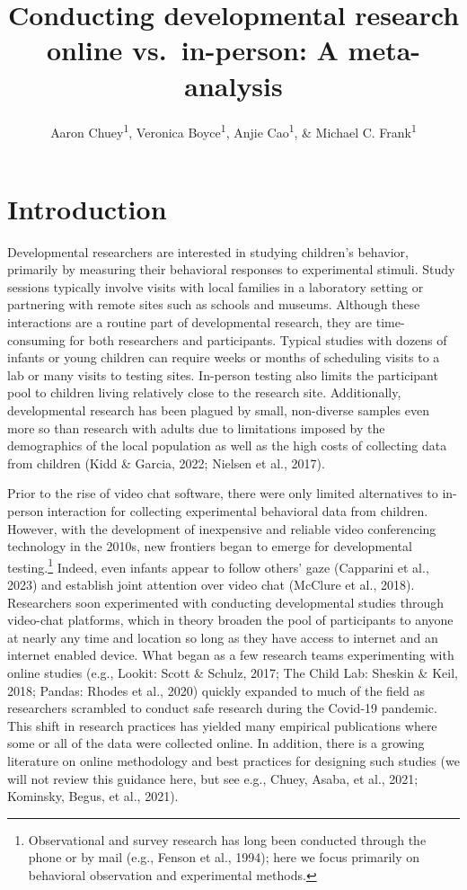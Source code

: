\documentclass[
  man,floatsintext]{apa6}
\title{Conducting developmental research online vs.~in-person: A meta-analysis}
\author{Aaron Chuey\textsuperscript{1}, Veronica Boyce\textsuperscript{1}, Anjie Cao\textsuperscript{1}, \& Michael C. Frank\textsuperscript{1}}
\date{}
\affiliation{\vspace{0.5cm}\textsuperscript{1} Stanford University, Department of Psychology}
\begin{document}
\maketitle

\hypertarget{introduction}{%
\section{Introduction}\label{introduction}}

Developmental researchers are interested in studying children's behavior, primarily by measuring their behavioral responses to experimental stimuli. Study sessions typically involve visits with local families in a laboratory setting or partnering with remote sites such as schools and museums. Although these interactions are a routine part of developmental research, they are time-consuming for both researchers and participants. Typical studies with dozens of infants or young children can require weeks or months of scheduling visits to a lab or many visits to testing sites. In-person testing also limits the participant pool to children living relatively close to the research site. Additionally, developmental research has been plagued by small, non-diverse samples even more so than research with adults due to limitations imposed by the demographics of the local population as well as the high costs of collecting data from children (Kidd \& Garcia, 2022; Nielsen et al., 2017).

Prior to the rise of video chat software, there were only limited alternatives to in-person interaction for collecting experimental behavioral data from children. However, with the development of inexpensive and reliable video conferencing technology in the 2010s, new frontiers began to emerge for developmental testing.\footnote{Observational and survey research has long been conducted through the phone or by mail (e.g., Fenson et al., 1994); here we focus primarily on behavioral observation and experimental methods.} Indeed, even infants appear to follow others' gaze (Capparini et al., 2023) and establish joint attention over video chat (McClure et al., 2018). Researchers soon experimented with conducting developmental studies through video-chat platforms, which in theory broaden the pool of participants to anyone at nearly any time and location so long as they have access to internet and an internet enabled device. What began as a few research teams experimenting with online studies (e.g., Lookit: Scott \& Schulz, 2017; The Child Lab: Sheskin \& Keil, 2018; Pandas: Rhodes et al., 2020) quickly expanded to much of the field as researchers scrambled to conduct safe research during the Covid-19 pandemic. This shift in research practices has yielded many empirical publications where some or all of the data were collected online. In addition, there is a growing literature on online methodology and best practices for designing such studies (we will not review this guidance here, but see e.g., Chuey, Asaba, et al., 2021; Kominsky, Begus, et al., 2021).
\end{document}

